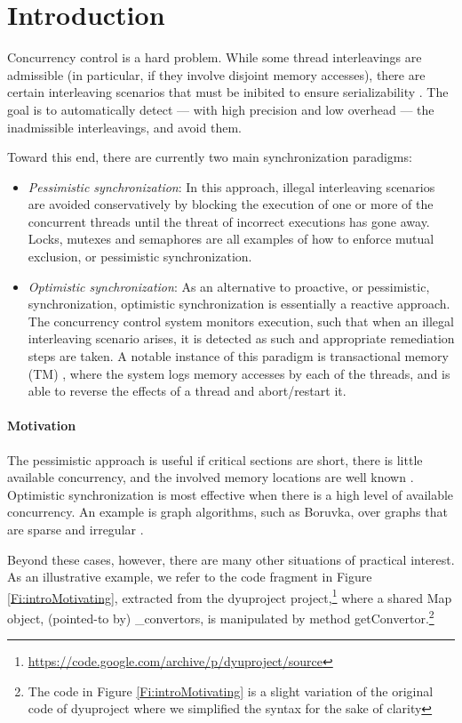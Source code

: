 \section{Introduction}

Concurrency control is a hard problem. While some thread interleavings are admissible (in particular, if they involve disjoint memory accesses), there are certain interleaving scenarios that must be inibited to ensure serializability \cite{Serializability}. The goal is to automatically detect --- with high precision and low overhead --- the inadmissible interleavings, and avoid them.  

Toward this end, there are currently two main synchronization paradigms:
\begin{itemize}
	\item \textit{Pessimistic synchronization}: In this approach, illegal interleaving scenarios are avoided conservatively by blocking the execution of one or more of the concurrent threads until the threat of incorrect executions has gone away. Locks, mutexes and semaphores are all examples of how to enforce mutual exclusion, or pessimistic synchronization.
	\item \textit{Optimistic synchronization}: As an alternative to proactive, or pessimistic, synchronization, optimistic synchronization is essentially a reactive approach. The concurrency control system monitors execution, such that when an illegal interleaving scenario arises, it is detected as such and appropriate remediation steps are taken. A notable instance of this paradigm is transactional memory (TM) \cite{DBLP:conf/isca/HerlihyM93}, where the system logs memory accesses by each of the threads, and is able to reverse the effects of a thread and abort/restart it.
\end{itemize}

\paragraph{Motivation} The pessimistic approach is useful if critical sections are short, there is little available concurrency, and the involved memory locations are well known \cite{AndiKleen}. Optimistic synchronization is most effective when there is a high level of available concurrency. An example is graph algorithms, such as Boruvka, over graphs that are sparse and irregular \cite{KulkarniGalois}.

Beyond these cases, however, there are many other situations of practical interest. As an illustrative example, we refer to the code fragment in Figure \ref{Fi:introMotivating}, extracted from the {\sf dyuproject} project,\footnote{\url{https://code.google.com/archive/p/dyuproject/source}} where a shared {\sf Map} object, (pointed-to by) {\sf \_convertors}, is manipulated by method {\sf getConvertor}.\footnote{The code in Figure \ref{Fi:introMotivating} is a slight variation of the original code of {\sf dyuproject} where we simplified the syntax for the sake of clarity}

